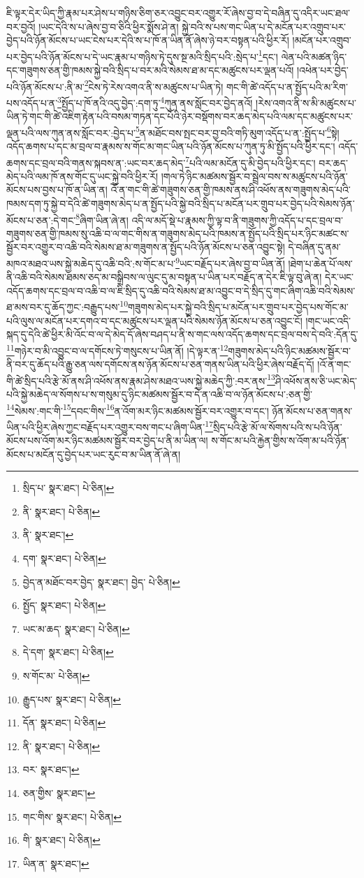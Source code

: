 ཇི་ལྟར་དེར་ཡིད་ཀྱི་རྣམ་པར་ཤེས་པ་གཉིས་ཅིག་ཅར་འབྱུང་བར་འགྱུར་རོ་ཞེས་བྱ་བ་དེ་བཞིན་དུ་འདིར་ཡང་ཐལ་བར་བྱའོ། །ཡང་དེའི་ས་པ་ཞེས་བྱ་བ་ཅིའི་ཕྱིར་སྨོས་ཤེ་ན། སྐྱེ་བའི་ས་པས་གང་ཡིན་པ་དེ་མངོན་པར་འགྲུབ་པར་བྱེད་པའི་ཉོན་མོངས་པ་ཡང་ངེས་པར་དེའི་ས་པ་ཁོ་ན་ཡིན་ནོ་ཞེས་ཉེ་བར་བསྟན་པའི་ཕྱིར་རོ། །མངོན་པར་འགྲུབ་པར་བྱེད་པའི་ཉོན་མོངས་པ་དེ་ཡང་རྣམ་པ་གཉིས་ཏེ་དུས་སྔ་མའི་སྲིད་པའི་:སྲེད་པ་\footnote{སྲིད་པ་  སྣར་ཐང་།  པེ་ཅིན། }དང་། ལེན་པའི་མཚན་ཉིད་དང་གཟུགས་ཅན་གྱི་ཁམས་སྐྱེ་བའི་སྲིད་པ་བར་མའི་སེམས་ཐ་མ་དང་མཚུངས་པར་ལྡན་པའོ། །འཕེན་པར་བྱེད་པའི་ཉོན་མོངས་པ་:ནི་མ་\footnote{ནི་  སྣར་ཐང་།  པེ་ཅིན། }ངེས་ཏེ་རེས་འགའ་ནི་ས་མཚུངས་པ་ཡིན་ཏེ། གང་གི་ཚེ་འདོད་པ་ན་སྤྱོད་པའི་མ་རིག་པས་འདོད་པ་ན་\footnote{ནི་  སྣར་ཐང་། }སྤྱོད་པ་ཁོ་ནའི་འདུ་བྱེད་:དག་ཏུ་\footnote{དག་  སྣར་ཐང་།  པེ་ཅིན། }ཀུན་ནས་སློང་བར་བྱེད་ནའོ། །རེས་འགའ་ནི་ས་མི་མཚུངས་པ་ཡིན་ཏེ་གང་གི་ཚེ་འཇིག་རྟེན་པའི་བསམ་གཏན་དང་པོའི་ཉེར་བསྡོགས་བར་ཆད་མེད་པའི་ལམ་དང་མཚུངས་པར་ལྡན་པའི་ལས་ཀུན་ནས་སློང་བར་:བྱེད་པ་\footnote{བྱེད་ན་མཐོང་བར་བྱེད་  སྣར་ཐང་། བྱེད་  པེ་ཅིན། }ན་མཐོང་བས་སྤང་བར་བྱ་བའི་གཏི་མུག་འདོད་པ་ན་:སྤྱོད་པ་\footnote{སྤྱོད་  སྣར་ཐང་།  པེ་ཅིན། }སྟེ། འདོད་ཆགས་པ་དང་མ་བྲལ་བ་རྣམས་ས་གོང་མ་གང་ཡིན་པའི་ཉོན་མོངས་པ་ཀུན་ཏུ་མི་སྤྱོད་པའི་ཕྱིར་དང་། འདོད་ཆགས་དང་བྲལ་བའི་གནས་སྐབས་ན་:ཡང་བར་ཆད་མེད་\footnote{ཡང་མ་ཆད་  སྣར་ཐང་།  པེ་ཅིན། }པའི་ལམ་མངོན་དུ་མི་བྱེད་པའི་ཕྱིར་དང་། བར་ཆད་མེད་པའི་ལམ་ཁོ་ནས་གོང་དུ་ཡང་སྐྱེ་བའི་ཕྱིར་རོ། །གལ་ཏེ་ཉིང་མཚམས་སྦྱོར་བ་སྦྲེལ་བས་ས་མཚུངས་པའི་ཉོན་མོངས་པས་བྱས་པ་ཁོ་ན་ཡིན་ན། འོ་ན་གང་གི་ཚེ་གཟུགས་ཅན་གྱི་ཁམས་ནས་ཤི་འཕོས་ནས་གཟུགས་མེད་པའི་ཁམས་དག་ཏུ་སྐྱེ་བ་དེའི་ཚེ་གཟུགས་མེད་པ་ན་སྤྱོད་པའི་སྐྱེ་བའི་སྲིད་པ་མངོན་པར་གྲུབ་པར་བྱེད་པའི་སེམས་ཉོན་མོངས་པ་ཅན་:དེ་གང་\footnote{དེ་དག་  སྣར་ཐང་།  པེ་ཅིན། }ཞིག་ཡིན་ཞེ་ན། འདི་ལ་མདོ་སྡེ་པ་རྣམས་ཀྱི་ལྟ་བ་ནི་གཟུགས་ཀྱི་འདོད་པ་དང་བྲལ་བ་གཟུགས་ཅན་གྱི་ཁམས་སུ་འཆི་བ་ལ་གང་གིས་ན་གཟུགས་མེད་པའི་ཁམས་ན་སྤྱོད་པའི་སྲིད་པར་ཉིང་མཚང་ས་སྦྱོར་བར་འགྱུར་བ་འཆི་བའི་སེམས་ཐ་མ་གཟུགས་ན་སྤྱོད་པའི་ཉོན་མོངས་པ་ཅན་འབྱུང་སྟེ། དེ་བཞིན་དུ་ནམ་མཁའ་མཐའ་ཡས་སྐྱེ་མཆེད་དུ་འཆི་བའི་:ས་གོང་མ་པ་\footnote{ས་གོང་མ་  པེ་ཅིན། }ཡང་བརྗོད་པར་ཞེས་བྱ་བ་ཡིན་ནོ། །ཐེག་པ་ཆེན་པོ་ལས་ནི་འཆི་བའི་སེམས་ཐམས་ཅད་མ་བསྒྲིབས་ལ་ལུང་དུ་མ་བསྟན་པ་ཡིན་པར་བརྗོད་ན་དེར་ཇི་ལྟ་བུ་ཞེ་ན། དེར་ཡང་འདོད་ཆགས་དང་བྲལ་བ་འཆི་བ་ལ་ཇི་སྲིད་དུ་འཆི་བའི་སེམས་ཐ་མ་འབྱུང་བ་དེ་སྲིད་དུ་གང་ཞིག་འཆི་བའི་སེམས་ཐ་མས་བར་དུ་ཆོད་ཀྱང་:བརྒྱུད་པས་\footnote{རྒྱུད་པས་  སྣར་ཐང་།  པེ་ཅིན། }གཟུགས་མེད་པར་སྐྱེ་བའི་སྲིད་པ་མངོན་པར་གྲུབ་པར་བྱེད་པས་གོང་མ་པའི་ལུས་ལ་མངོན་པར་དགའ་བ་དང་མཚུངས་པར་ལྡན་པའི་སེམས་ཉོན་མོངས་པ་ཅན་འབྱུང་ངོ། །གང་ཡང་འདི་སྐད་དུ་དེའི་ཚེ་ཕྱིར་མི་འོང་བ་ལ་དེ་མེད་དོ་ཞེས་བཤད་པ་ནི་ས་གང་ལས་འདོད་ཆགས་དང་བྲལ་བས་དེ་བའི་:དོན་དུ་\footnote{དོན་  སྣར་ཐང་།  པེ་ཅིན། }གཉེར་བ་མི་འབྱུང་བ་ལ་དགོངས་ཏེ་གསུངས་པ་ཡིན་ནོ། །དེ་ལྟར་ན་\footnote{ནི་  སྣར་ཐང་།  པེ་ཅིན། }གཟུགས་མེད་པའི་ཉིང་མཚམས་སྦྱོར་བ་ནི་བར་དུ་ཆོད་པའི་རྒྱུ་ཅན་ལས་དགོངས་ནས་ཉོན་མོངས་པ་ཅན་གནས་ཡིན་པའི་ཕྱིར་ཞེས་བརྗོད་དོ། །འོ་ན་གང་གི་ཚེ་སྲིད་པའི་རྩེ་མོ་ནས་ཤི་འཕོས་ནས་རྣམ་ཤེས་མཐའ་ཡས་སྐྱེ་མཆེད་ཀྱི་:བར་ནས་\footnote{བར་  སྣར་ཐང་། }ཤི་འཕོས་ནས་ཅི་ཡང་མེད་པའི་སྐྱེ་མཆེད་ལ་སོགས་པ་ས་གསུམ་དུ་ཉིང་མཚམས་སྦྱོར་བ་དེ་ན་འཆི་བ་ལ་ཉོན་མོངས་པ་:ཅན་གྱི་\footnote{ཅན་གྱིས་  སྣར་ཐང་། }སེམས་:གང་གི་\footnote{གང་གིས་  སྣར་ཐང་།  པེ་ཅིན། }དབང་གིས་\footnote{གི་  སྣར་ཐང་།  པེ་ཅིན། }ན་འོག་མར་ཉིང་མཚམས་སྦྱོར་བར་འགྱུར་བ་དང་། ཉོན་མོངས་པ་ཅན་གནས་ཡིན་པའི་ཕྱིར་ཞེས་ཀྱང་བརྗོད་པར་འགྱུར་བས་གང་པ་ཞིག་ཡིན་\footnote{ཡིན་ན་  སྣར་ཐང་། }སྲིད་པའི་རྩེ་མོ་ལ་སོགས་པའི་ས་པའི་ཉོན་མོངས་པས་འོག་མར་ཉིང་མཚམས་སྦྱོར་བར་བྱེད་པ་ནི་མ་ཡིན་ལ། ས་གོང་མ་པའི་རྐྱེན་གྱིས་ས་འོག་མ་པའི་ཉོན་མོངས་པ་མངོན་དུ་བྱེད་པར་ཡང་རུང་བ་མ་ཡིན་ནོ་ཞེ་ན། 